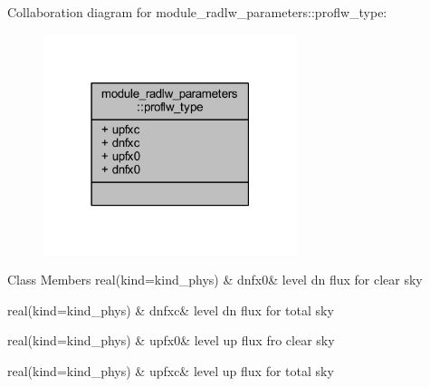 Collaboration diagram for module\+\_\+radlw\+\_\+parameters\+:\+:proflw\+\_\+type\+:\nopagebreak
\begin{figure}[H]
\begin{center}
\leavevmode
\includegraphics[width=210pt]{structmodule__radlw__parameters_1_1proflw__type__coll__graph}
\end{center}
\end{figure}
\begin{DoxyFields}{Class Members}
real(kind=kind\+\_\+phys)\hypertarget{namespacemodule__radlw__parameters_a4804a215b761165846e87428b3f3c12c}{}\label{namespacemodule__radlw__parameters_a4804a215b761165846e87428b3f3c12c}
&
dnfx0&
level dn flux for clear sky \\
\hline

real(kind=kind\+\_\+phys)\hypertarget{namespacemodule__radlw__parameters_a5f7ae4abe7912e8dbe371b577ba91945}{}\label{namespacemodule__radlw__parameters_a5f7ae4abe7912e8dbe371b577ba91945}
&
dnfxc&
level dn flux for total sky \\
\hline

real(kind=kind\+\_\+phys)\hypertarget{namespacemodule__radlw__parameters_a90ec3938bb024acfd6f78d597890e78a}{}\label{namespacemodule__radlw__parameters_a90ec3938bb024acfd6f78d597890e78a}
&
upfx0&
level up flux fro clear sky \\
\hline

real(kind=kind\+\_\+phys)\hypertarget{namespacemodule__radlw__parameters_aefd4bfa2053b7e88173ac73ca219a9b2}{}\label{namespacemodule__radlw__parameters_aefd4bfa2053b7e88173ac73ca219a9b2}
&
upfxc&
level up flux for total sky \\
\hline

\end{DoxyFields}
\label{structmodule__radlw__parameters_1_1sfcflw__type}
\hypertarget{namespacemodule__radlw__parameters_structmodule__radlw__parameters_1_1sfcflw__type}{}
